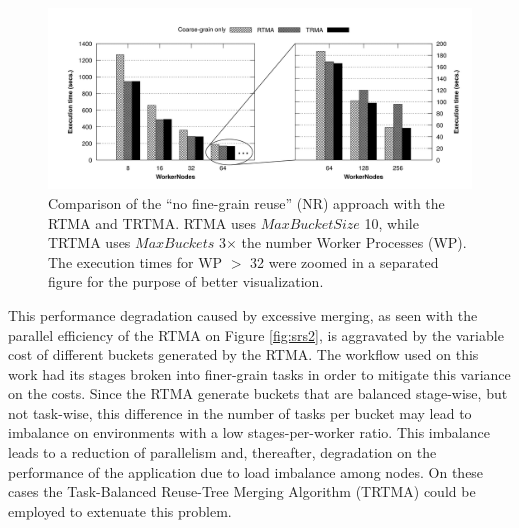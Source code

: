 \begin{figure}[h]
\begin{center}
    \includegraphics[width=1\textwidth]{img/scale-new}
	\caption{Comparison of the ``no fine-grain reuse'' (NR) approach with the RTMA and TRTMA. RTMA uses $MaxBucketSize$ 10, while TRTMA uses $MaxBuckets$ 3$\times$ the number Worker Processes (WP). The execution times for WP $>$ 32 were zoomed in a separated figure for the purpose of better visualization.}
	\label{fig:scale-new}
\end{center}
\vspace*{-3ex}
\end{figure}

This performance degradation caused by excessive merging, as seen with the parallel efficiency of the RTMA on Figure \ref{fig:srs2}, is aggravated by the variable cost of different buckets generated by the RTMA. The workflow used on this work had its stages broken into finer-grain tasks in order to mitigate this variance on the costs. Since the RTMA generate buckets that are balanced stage-wise, but not task-wise, this difference in the number of tasks per bucket may lead to imbalance on environments with a low stages-per-worker ratio. This imbalance leads to a reduction of parallelism and, thereafter, degradation on the performance of the application due to load imbalance among nodes. On these cases the Task-Balanced Reuse-Tree Merging Algorithm (TRTMA) could be employed to extenuate this problem.


